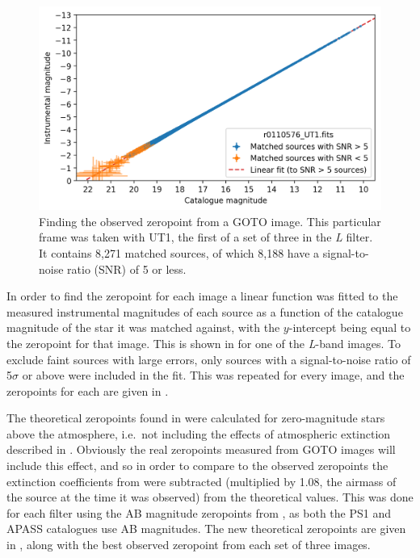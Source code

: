 \begin{colsection}
\begin{figure}[t]
    \begin{center}
        \includegraphics[width=\linewidth]{images/throughput/zeropoint_real.png}
    \end{center}
    \caption[Finding the observed zeropoint from a GOTO image]{
        Finding the observed zeropoint from a GOTO image. This particular frame was taken with UT1, the first of a set of three in the \textit{L} filter. It contains 8,271 matched sources, of which 8,188 have a signal-to-noise ratio (SNR) of 5 or less.
    }\label{fig:zeropoint}
\end{figure}

In order to find the zeropoint for each image a linear function was fitted to the measured instrumental magnitudes of each source as a function of the catalogue magnitude of the star it was matched against, with the $y$-intercept being equal to the zeropoint for that image. This is shown in  for one of the \textit{L}-band images. To exclude faint sources with large errors, only sources with a signal-to-noise ratio of 5$\sigma$ or above were included in the fit. This was repeated for every image, and the zeropoints for each are given in .

The theoretical zeropoints found in  were calculated for zero-magnitude stars above the atmosphere, i.e.\ not including the effects of atmospheric extinction described in . Obviously the real zeropoints measured from GOTO images will include this effect, and so in order to compare to the observed zeropoints the extinction coefficients from  were subtracted (multiplied by 1.08, the airmass of the source at the time it was observed) from the theoretical values. This was done for each filter using the AB magnitude zeropoints from , as both the PS1 and APASS catalogues use AB magnitudes. The new theoretical zeropoints are given in , along with the best observed zeropoint from each set of three images.


\end{colsection}
